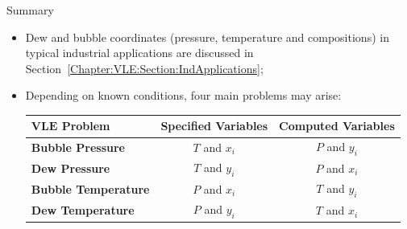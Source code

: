 \begin{FinalSummaryBlock}{Summary}
\begin{itemize}
       \item Dew and bubble coordinates (pressure, temperature and compositions) in typical industrial applications are discussed in Section~\ref{Chapter:VLE:Section:IndApplications};
       \item Depending on known conditions, four main problems may arise:
\begin{center}
   \begin{tabular}{|l c c|}
      \hline 
      $\mathbf{VLE}$ {\bf Problem} & {\bf Specified Variables} &  {\bf Computed Variables} \\  
      \hline
          {\bf Bubble Pressure}        &  $T$ and $x_{i}$           &   $P$ and $y_{i}$          \\
          {\bf Dew Pressure}           &  $T$ and $y_{i}$           &   $P$ and $x_{i}$          \\
          {\bf Bubble Temperature}     &  $P$ and $x_{i}$           &   $T$ and $y_{i}$          \\
          {\bf Dew Temperature}        &  $P$ and $y_{i}$           &   $T$ and $x_{i}$          \\     
      \hline
   \end{tabular}
\end{center}
    \end{itemize}
\end{FinalSummaryBlock}


\clearpage
